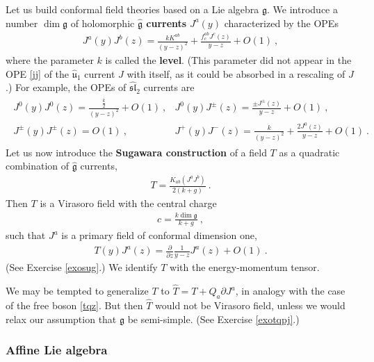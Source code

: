 \documentclass[12pt, a4paper, notitlepage, twoside]{report}
\numberwithin{equation}{section}
\theoremstyle{break}
\begin{document}
Let us build conformal field theories based on a Lie algebra $\mathfrak{g}$. 
We introduce a number $\dim \mathfrak{g}$ of holomorphic \textbf{\boldmath $\hat{\mathfrak{g}}$ currents} $J^a(y)$ characterized by the OPEs 
\begin{align}
 \boxed{ J^a(y) J^b(z) = \frac{k K^{ab}}{(y-z)^2} +  \frac{ f^{ab}_c J^c(z)}{y-z}  + O(1)} \ ,
\label{jajb}
\end{align}
where the parameter $k$ is called the \textbf{level}. (This parameter did not appear in the OPE \eqref{jj} of the $\hat{\mathfrak{u}}_1$ current $J$ with itself, as it could be absorbed in a rescaling of $J$.) For example, the OPEs of $\widehat{\mathfrak{sl}}_2$ currents are
\begin{align}
\begin{array}{ll}
  J^0(y)J^0(z) = \frac{\frac{k}{2}}{(y-z)^2} + O(1)\ ,  & J^0(y)J^\pm(z) = \frac{\pm J^\pm(z)}{y-z} + O(1)\ ,
\\
 J^\pm(y)J^\pm(z) = O(1) \ , & J^+(y)J^-(z) = \frac{k}{(y-z)^2} + \frac{2J^0(z)}{y-z} + O(1)\ .
\end{array}
\label{jjjj}
\end{align}
Let us now introduce the \textbf{\boldmath Sugawara construction} of a field $T$ as a quadratic combination of $\hat{\mathfrak{g}}$ currents,
\begin{align}
\boxed{ T =  \frac{ K_{ab} (J^aJ^b)}{2(k+g)} } \ .
\label{tjj} 
\end{align}
Then $T$ is a Virasoro field with the central charge 
\begin{align}
 \boxed{ c = \frac{ k \dim \mathfrak{g}}{k+g} }\ ,
\label{ckg}
\end{align}
such that $J^a$ is a primary field of conformal dimension one, 
\begin{align}
\boxed{ T(y)J^a(z) = {\frac{\partial}{\partial z}} \frac{1}{y-z} J^a(z) + O(1)} \ .
\label{tja}
\end{align}
(See Exercise \ref{exosug}.)
We identify $T$ with the energy-momentum tensor.

We may be tempted to generalize $T$ to $\hat{T} = T + Q_a\partial J^a$, in analogy with the case of the free boson \eqref{tqz}. 
But then $\hat{T}$ would not be Virasoro field, unless we would relax our assumption that $\mathfrak{g}$ be semi-simple. (See Exercise \ref{exotqpj}.)

\subsubsection{Affine Lie algebra}
\end{document}
